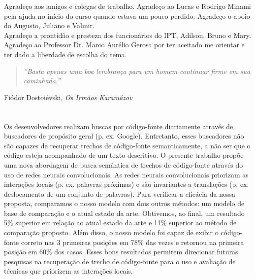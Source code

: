 \documentclass[12pt,oneside,a4paper]{book} %
\begin{document}
Agradeço aos amigos e colegas de trabalho. Agradeço ao Lucas e Rodrigo Minami pela ajuda no início do curso quando estava um pouco perdido. Agradeço o apoio do Augusto, Juliano e Valmir.
\\

Agradeço a prontidão e presteza dos funcionários do IPT, Adilson, Bruno e Mary.
\\

Agradeço ao Professor Dr. Marco Aurélio Gerosa por ter aceitado me orientar e ter dado a liberdade de escolha do tema. 

\newpage
\thispagestyle{empty}

\begin{center}
        \vspace*{18 cm}
        \begin{quote}
            \textit{''Basta apenas uma boa lembrança para um homem continuar firme em sua caminhada.''}
        \end{quote}
        \begin{flushright}
        Fiódor Dostoiévski, \textit{Os Irmãos Karamázov}\\
        \end{flushright}
    \end{center}


\pagebreak
\chapter*{}
\thispagestyle{empty}

Os desenvolvedores realizam buscas por código-fonte diariamente através de buscadores de propósito geral (p. ex. Google). Entretanto, esses buscadores não são capazes de recuperar trechos de código-fonte semanticamente, a não ser que o código esteja acompanhado de um texto descritivo. O presente trabalho propõe uma nova abordagem de busca semântica de trechos de código-fonte através do uso de redes neurais convolucionais. As redes neurais convolucionais priorizam as interações locais (p. ex. palavras próximas) e são invariantes a translações (p. ex. deslocamento de um conjunto de palavras). Para verificar a eficácia da nossa proposta, comparamos o nosso modelo com dois outros métodos: um modelo de base de comparação e o atual estado da arte. Obtivemos, ao final, um resultado 5\% superior em relação ao atual estado da arte e 11\% superior ao método de comparação proposto. Além disso, o nosso modelo foi capaz de exibir o código-fonte correto nas 3 primeiras posições em 78\% das vezes e retornou na primeira posição em 60\% dos casos. Esses bons resultados permitem direcionar futuras pesquisas na recuperação de trecho de código-fonte para o uso e avaliação de técnicas que priorizem as interações locais.
\\
\end{document}
